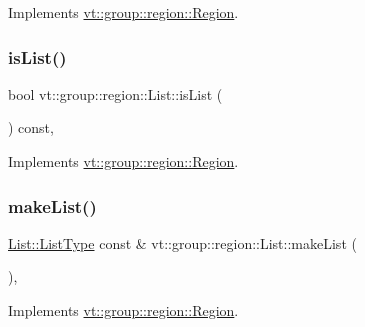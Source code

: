 Implements \hyperlink{structvt_1_1group_1_1region_1_1_region_a09d21333389937f11dd5d3e6ba566c54}{vt\+::group\+::region\+::\+Region}.

\mbox{\label{structvt_1_1group_1_1region_1_1_list_abdde7f8c33453db1938e9a27b3f18bd9}} 
\subsubsection{\texorpdfstring{is\+List()}{isList()}}
{\footnotesize\ttfamily bool vt\+::group\+::region\+::\+List\+::is\+List (\begin{DoxyParamCaption}{ }\end{DoxyParamCaption}) const\hspace{0.3cm}{\ttfamily [override]}, {\ttfamily [virtual]}}



Implements \hyperlink{structvt_1_1group_1_1region_1_1_region_a5c05e6ebee5a6d7e77d9ebf33c9ff50c}{vt\+::group\+::region\+::\+Region}.

\mbox{\label{structvt_1_1group_1_1region_1_1_list_ade171ca43a1bef2feef9952625fba71a}} 
\subsubsection{\texorpdfstring{make\+List()}{makeList()}}
{\footnotesize\ttfamily \hyperlink{structvt_1_1group_1_1region_1_1_region_a4e35b2fc6dca06aca0b7bc0e19b35c5a}{List\+::\+List\+Type} const  \& vt\+::group\+::region\+::\+List\+::make\+List (\begin{DoxyParamCaption}{ }\end{DoxyParamCaption})\hspace{0.3cm}{\ttfamily [override]}, {\ttfamily [virtual]}}



Implements \hyperlink{structvt_1_1group_1_1region_1_1_region_ac85c027b3c402c712c888aefc198c6be}{vt\+::group\+::region\+::\+Region}.

\mbox{\label{structvt_1_1group_1_1region_1_1_list_a60aabaef773693847cb82501bfe8d0ad}} 
